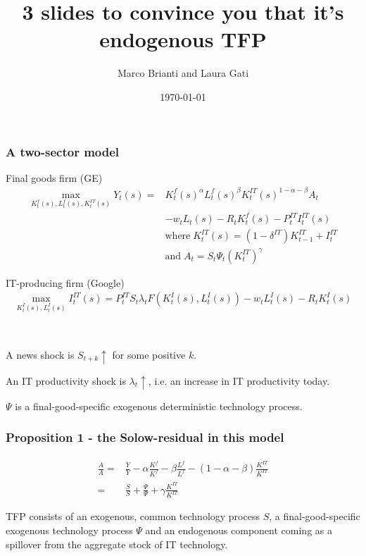 \documentclass{beamer}
\author[Brianti, Gati]{Marco Brianti and Laura Gati}
\institute[Boston College]{Boston College}
\title{3 slides to convince you that it's endogenous TFP}
\date{\today}
\begin{document}
\begin{frame}

\maketitle


\end{frame}


\begin{frame}
\frametitle{A two-sector model}

Final goods firm (GE)
\begin{align*}
\max_{K^f_t(s), L^f_t(s), K^{IT}_t(s) } Y_t(s) =  & K^f_t(s)^{\alpha}L^f_t(s)^{\beta}K^{IT}_t(s)^{1-\alpha - \beta}A_t \\
 & - w_t L_t(s) -R_tK^f_t(s) -P^{IT}_t I^{IT}_t(s) \\
 & \text{where} \; K^{IT}_t(s) =  (1-\delta^{IT})K^{IT}_{t-1} + I^{IT}_t \\
 & \text{and} \; A_t =  S_t \Psi_t (K^{IT}_t)^{\gamma}
\end{align*}

IT-producing firm (Google)
\begin{align*}
\max_{K^{I}_t(s), L^{I}_t(s)} I^{IT}_t(s) = P^{IT}_t S_t \lambda_t F(K^I_t(s), L^I_t(s)) -w_t L^I_t(s) - R_t K^I_t(s)
\end{align*}

\

A news shock is $S_{t+k} \uparrow$ for some positive $k$. 

An IT productivity shock is $\lambda_{t} \uparrow$, i.e. an increase in IT productivity today. 

$\Psi$ is a final-good-specific exogenous deterministic technology process.

\end{frame}

\begin{frame}
\frametitle{Proposition 1 - the Solow-residual in this model}

\begin{align*}
\frac{\dot{A}}{A} = & \frac{\dot{Y}}{Y} - \alpha \frac{\dot{K^f}}{K^f} - \beta \frac{\dot{L^f}}{L^f} - (1-\alpha - \beta) \frac{\dot{K^{IT}}}{K^{IT}} \\
= & \frac{\dot{S}}{S} + \frac{\dot{\Psi}}{\Psi} + \gamma \frac{\dot{K^{IT}}}{K^{IT}}
\end{align*}

TFP consists of an exogenous, common technology process $S$, a final-good-specific exogenous technology process $\Psi$ and an endogenous component coming as a spillover from the aggregate stock of IT technology. 
\end{frame}
\end{document}
